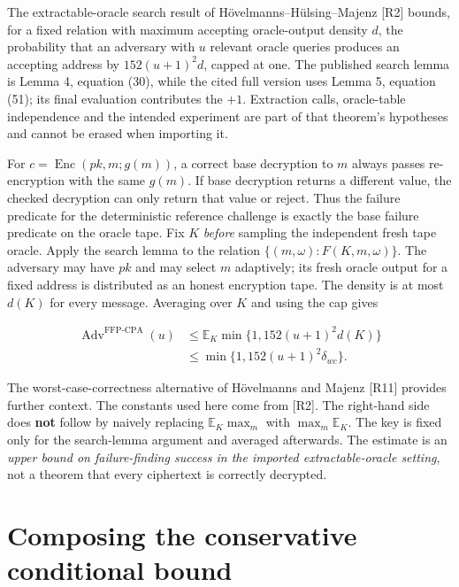 \documentclass[
  11pt,
  a4paper,
  oneside]{report}
\begin{document}
The extractable-oracle search result of Hövelmanns--Hülsing--Majenz
{[}R2{]} bounds, for a fixed relation with maximum accepting
oracle-output density \(d\), the probability that an adversary with
\(u\) relevant oracle queries produces an accepting address by
\(152(u+1)^2 d\), capped at one. The published search lemma is Lemma 4,
equation (30), while the cited full version uses Lemma 5, equation (51);
its final evaluation contributes the \(+1\). Extraction calls,
oracle-table independence and the intended experiment are part of that
theorem's hypotheses and cannot be erased when importing it.

For \(c=\operatorname{Enc}(pk,m;g(m))\), a correct base decryption to
\(m\) always passes re-encryption with the same \(g(m)\). If base
decryption returns a different value, the checked decryption can only
return that value or reject. Thus the failure predicate for the
deterministic reference challenge is exactly the base failure predicate
on the oracle tape. Fix \(K\) \emph{before} sampling the independent
fresh tape oracle. Apply the search lemma to the relation
\(\{(m,\omega):F(K,m,\omega)\}\). The adversary may have \(pk\) and may
select \(m\) adaptively; its fresh oracle output for a fixed address is
distributed as an honest encryption tape. The density is at most
\(d(K)\) for every message. Averaging over \(K\) and using the cap gives

\[
\begin{split}
\operatorname{Adv}^{\mathrm{FFP\text{-}CPA}}(u)
&\le\mathbb E_K\min\{1,152(u+1)^2d(K)\}\\
&\le\min\{1,152(u+1)^2\delta_{wc}\}.
\end{split}
\]

The worst-case-correctness alternative of Hövelmanns and Majenz
{[}R11{]} provides further context. The constants used here come from
{[}R2{]}. The right-hand side does \textbf{not} follow by naively
replacing \(\mathbb E_K\max_m\) with \(\max_m\mathbb E_K\). The key is
fixed only for the search-lemma argument and averaged afterwards. The
estimate is an \emph{upper bound on failure-finding success in the
imported extractable-oracle setting}, not a theorem that every
ciphertext is correctly decrypted.

\section{Composing the conservative conditional
bound}\label{composing-the-conservative-conditional-bound}
\end{document}
